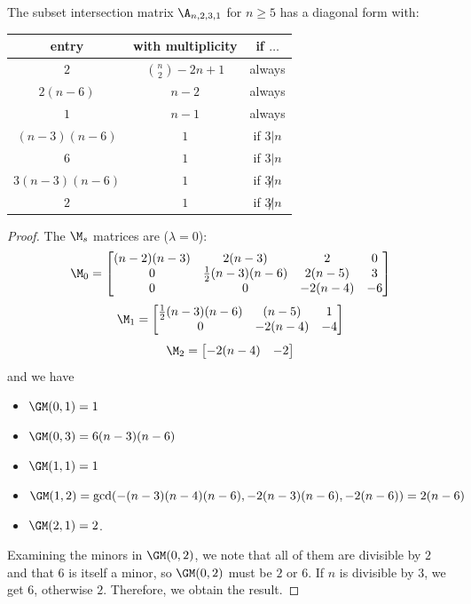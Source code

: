 \begin{theorem}
The subset intersection matrix $\A_{n, 2, 3, 1}$ for $n \geq 5$ has a diagonal form with:
\begin{center}
\begin{tabular}{ |c|c|c| } 
 \hline
 entry & with multiplicity & if $\ldots$ \\
 \hline
 $2$ & $\binom{n}{2} - 2n + 1$ & always \\
 $2(n - 6)$ & $n - 2$ & always \\
 $1$ & $n - 1$ & always \\
 $(n-3)(n-6)$ & $1$ & if $3 | n$ \\
 $6$ & $1$ & if $3 | n$ \\
 $3(n-3)(n-6)$ & $1$ & if $3 \not | n$ \\
 $2$ & $1$ & if $3 \not | n$ \\
 \hline
\end{tabular}
\end{center}
\end{theorem}
\begin{proof}
The $\M_s$ matrices are ($\lambda = 0$):
\[ \M_0 = \begin{bmatrix} (n-2)(n-3) & 2(n-3) & 2 & 0 \\ 0 & \frac{1}{2}(n-3)(n-6) & 2(n-5) & 3 \\ 0 & 0 & -2(n-4) & -6 \end{bmatrix}  \]
\[ \M_1 = \begin{bmatrix} \frac{1}{2}(n-3)(n-6) & (n-5) & 1 \\ 0 & -2(n-4) & -4 \end{bmatrix}  \]
\[ \M_2 = \begin{bmatrix} -2(n-4) & -2 \end{bmatrix}  \]
and we have
\begin{itemize} 
    \item $\GM(0,1) = 1$
    \item $\GM(0,3) = 6(n - 3)(n - 6)$
    \item $\GM(1,1) = 1$
    \item $\GM(1,2) = \gcd( -(n - 3)(n - 4)(n - 6), -2(n - 3)(n - 6), -2(n - 6) ) = 2(n-6)$
    \item $\GM(2,1) = 2$.
\end{itemize}

Examining the minors in $\GM(0,2)$, we note that all of them are divisible by $2$ and that $6$ is itself a minor, so $\GM(0,2)$ must be $2$ or $6$.
If $n$ is divisible by $3$, we get $6$, otherwise $2$.  Therefore, we obtain the result.
\end{proof}

